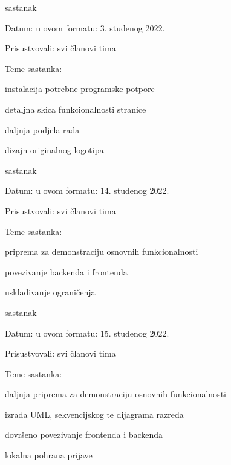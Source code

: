 \begin{packed_enum}
			\item  sastanak
			\item[] \begin{packed_item}
				\item Datum: u ovom formatu: 3. studenog 2022.
				\item Prisustvovali: svi članovi tima
				\item Teme sastanka:
				\begin{packed_item}
					\item  instalacija potrebne programske potpore
					\item  detaljna skica funkcionalnosti stranice
					\item  daljnja podjela rada
					\item  dizajn originalnog logotipa
				\end{packed_item}
			\end{packed_item}
		
			\item  sastanak
			\item[] \begin{packed_item}
				\item Datum: u ovom formatu: 14. studenog 2022.
				\item Prisustvovali: svi članovi tima
				\item Teme sastanka:
				\begin{packed_item}
					\item  priprema za demonstraciju osnovnih funkcionalnosti
					\item  povezivanje backenda i frontenda
					\item  usklađivanje ograničenja
				\end{packed_item}
			\end{packed_item}
		
			\item  sastanak
			\item[] \begin{packed_item}
				\item Datum: u ovom formatu: 15. studenog 2022.
				\item Prisustvovali: svi članovi tima
				\item Teme sastanka:
				\begin{packed_item}
					\item  daljnja priprema za demonstraciju osnovnih funkcionalnosti
					\item  izrada UML, sekvencijskog te dijagrama razreda
					\item  dovršeno povezivanje frontenda i backenda
					\item  lokalna pohrana prijave
				\end{packed_item}
			\end{packed_item}
			
			
		\end{packed_enum}
		
